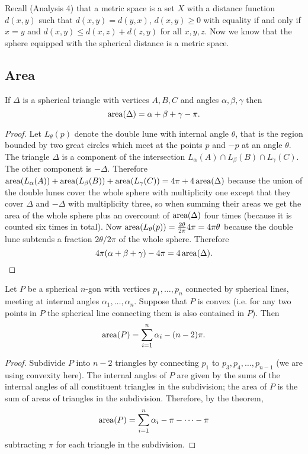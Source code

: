 \documentclass[12pt]{article}
\begin{document}
Recall (Analysis 4) that a metric space is a set $X$ with a distance function $d(x,y)$ such that $d(x,y)=d(y,x)$, $d(x,y)\geq 0$ with equality if and only if $x=y$ and $d(x,y)\leq d(x,z)+d(z,y)$ for all $x,y,z$. Now we know that the sphere equipped with the spherical distance is a metric space.

\subsection{Area}

\begin{thm}
  If $\Delta$ is a spherical triangle with vertices $A,B,C$ and angles $\alpha,\beta,\gamma$ then
  \[\operatorname{area}(\Delta)=\alpha+\beta+\gamma-\pi.\]
\end{thm}
\begin{proof}
  Let $L_\theta(p)$ denote the double lune with internal angle $\theta$, that is the region bounded by two great circles which meet at the points $p$ and $-p$ at an angle $\theta$. The triangle $\Delta$ is a component of the intersection $L_\alpha(A)\cap L_\beta(B)\cap L_\gamma(C)$. The other component is $-\Delta$. Therefore $\operatorname{area}(L_\alpha(A))+\operatorname{area}(L_\beta(B))+\operatorname{area}(L_\gamma(C))=4\pi+4\operatorname{area}(\Delta)$ because the union of the double lunes cover the whole sphere with multiplicity one except that they cover $\Delta$ and $-\Delta$ with multiplicity three, so when summing their areas we get the area of the whole sphere plus an overcount of $\operatorname{area}(\Delta)$ four times (because it is counted six times in total). Now $\operatorname{area}(L_\theta(p))=\frac{2\theta}{2\pi}4\pi=4\pi\theta$ because the double lune subtends a fraction $2\theta/2\pi$ of the whole sphere. Therefore
  \[4\pi(\alpha+\beta+\gamma)-4\pi=4\operatorname{area}(\Delta).\]
\end{proof}

\begin{cor}
  Let $P$ be a spherical $n$-gon with vertices $p_1,\ldots,p_n$ connected by spherical lines, meeting at internal angles $\alpha_1,\ldots,\alpha_n$. Suppose that $P$ is convex (i.e. for any two points in $P$ the spherical line connecting them is also contained in $P$). Then
  \[\operatorname{area}(P)=\sum_{i=1}^n\alpha_i-(n-2)\pi.\]
\end{cor}
\begin{proof}
  Subdivide $P$ into $n-2$ triangles by connecting $p_1$ to $p_3,p_4,\ldots,p_{n-1}$ (we are using convexity here). The internal angles of $P$ are given by the sums of the internal angles of all constituent triangles in the subdivision; the area of $P$ is the sum of areas of triangles in the subdivision. Therefore, by the theorem,
  \[\operatorname{area}(P)=\sum_{i=1}^n\alpha_i-\pi-\cdots-\pi\]
  subtracting $\pi$ for each triangle in the subdivision.
\end{proof}
\end{document}
